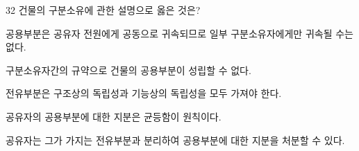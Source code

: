 \begin{question}{32}
건물의 구분소유에 관한 설명으로 옳은 것은?
\begin{choices}
  \item 공용부분은 공유자 전원에게 공동으로 귀속되므로 일부 구분소유자에게만 귀속될 수는 없다.
  \item 구분소유자간의 규약으로 건물의 공용부분이 성립할 수 없다.
  \item 전유부분은 구조상의 독립성과 기능상의 독립성을 모두 가져야 한다.
  \item 공유자의 공용부분에 대한 지분은 균등함이 원칙이다.
  \item 공유자는 그가 가지는 전유부분과 분리하여 공용부분에 대한 지분을 처분할 수 있다.
\end{choices}
\end{question}
